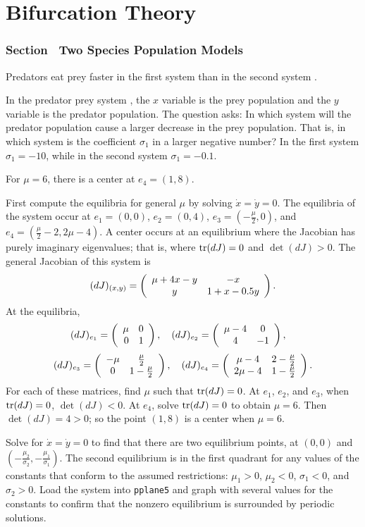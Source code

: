 \chapter{Bifurcation Theory}

\subsection*{Section~\protect{\ref{S:TSPM}} Two Species Population Models}

\ans Predators eat prey faster in the first system  than in 
the second system .

\soln  In the predator prey system , the $x$ variable is the
prey population and the $y$ variable is the predator population.  The
question asks: In which system will the predator population cause a
larger decrease in the prey population.  That is, in which system is
the coefficient $\sigma_1$ in  a larger negative number?  In
the first system $\sigma_1=-10$, while in the second system $\sigma_1=-0.1$.

\ans For $\mu = 6$, there is a center at $e_4 = (1,8)$.

\soln First compute the equilibria for general $\mu$ by solving
$\dot{x} = \dot{y} = 0$.  The equilibria of the system occur at
$e_1 = (0,0)$, $e_2 = (0,4)$, $e_3 = (-\frac{\mu}{2},0)$, and
$e_4 = (\frac{\mu}{2} - 2, 2\mu - 4)$.  A center occurs at an equilibrium
where the Jacobian has purely imaginary eigenvalues; that is, where
${\rm tr}{(dJ)} = 0$ and $\det{(dJ)} > 0$.  The general Jacobian of this
system is
\[
(dJ)_{(x,y)} = \left(\begin{array}{cc} \mu + 4x - y & -x\\ y &1 + x - 0.5y\end{array}\right).
\]
At the equilibria,
\[
(dJ)_{e_1} = \left(\begin{array}{rr} \mu & 0\\ 0 &1\end{array}\right), \quad
(dJ)_{e_2} = \left(\begin{array}{cc} \mu - 4 & 0\\ 4 &-1\end{array}\right), \quad
\]
\[
(dJ)_{e_3} = \left(\begin{array}{cc} -\mu & \frac{\mu}{2}\\ 0 &1 - \frac{\mu}{2}\end{array}\right), \quad
(dJ)_{e_4} = \left(\begin{array}{cc} \mu - 4 & 2 - \frac{\mu}{2}\\ 2\mu - 4 &1 -
\frac{\mu}{2}\end{array}\right).
\]
For each of these matrices, find $\mu$ such that ${\rm tr}{(dJ)} = 0$.  At
$e_1$, $e_2$, and $e_3$, when ${\rm tr}{(dJ)} = 0$, $\det{(dJ)} < 0$.
At $e_4$, solve ${\rm tr}(dJ) = 0$ to obtain $\mu = 6$.  Then $\det{(dJ)}
= 4 > 0$; so the point $(1,8)$ is a center when $\mu = 6$.

\newpage
{}
Solve  for $\dot{x} = \dot{y} = 0$ to find that there are
two equilibrium points, at $(0,0)$ and $(-\frac{\mu_2}{\sigma_2},
-\frac{\mu_1}{\sigma_1})$.  The second equilibrium is in the first
quadrant for any values of the constants that conform to the assumed
restrictions: $\mu_1 > 0$, $\mu_2 < 0$, $\sigma_1 < 0$, and
$\sigma_2 > 0$.  Load the system into {\tt pplane5} and graph with
several values for the constants to confirm that the nonzero
equilibrium is surrounded by periodic solutions.

